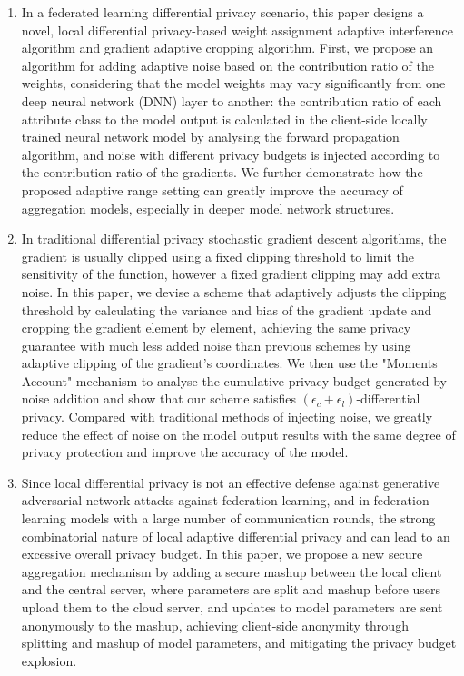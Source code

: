 \begin{enumerate}
	\item In a federated learning differential privacy scenario, this paper designs a novel, local differential privacy-based weight assignment adaptive interference algorithm and gradient adaptive cropping algorithm. First, we propose an algorithm for adding adaptive noise based on the contribution ratio of the weights, considering that the model weights may vary significantly from one deep neural network (DNN) layer to another: the contribution ratio of each attribute class to the model output is calculated in the client-side locally trained neural network model by analysing the forward propagation algorithm, and noise with different privacy budgets is injected according to the contribution ratio of the gradients. We further demonstrate how the proposed adaptive range setting can greatly improve the accuracy of aggregation models, especially in deeper model network structures.

	\item In traditional differential privacy stochastic gradient descent algorithms, the gradient is usually clipped using a fixed clipping threshold to limit the sensitivity of the function, however a fixed gradient clipping may add extra noise. In this paper, we devise a scheme that adaptively adjusts the clipping threshold by calculating the variance and bias of the gradient update and cropping the gradient element by element, achieving the same privacy guarantee with much less added noise than previous schemes by using adaptive clipping of the gradient's coordinates. We then use the "Moments Account" mechanism to analyse the cumulative privacy budget generated by noise addition and show that our scheme satisfies $\left(\epsilon_{c}+\epsilon_{l}\right)$-differential privacy. Compared with traditional methods of injecting noise, we greatly reduce the effect of noise on the model output results with the same degree of privacy protection and improve the accuracy of the model.

	\item Since local differential privacy is not an effective defense against generative adversarial network attacks against federation learning, and in federation learning models with a large number of communication rounds, the strong combinatorial nature of local adaptive differential privacy and can lead to an excessive overall privacy budget. In this paper, we propose a new secure aggregation mechanism by adding a secure mashup between the local client and the central server, where parameters are split and mashup before users upload them to the cloud server, and updates to model parameters are sent anonymously to the mashup, achieving client-side anonymity through splitting and mashup of model parameters, and mitigating the privacy budget explosion.


\end{enumerate}
